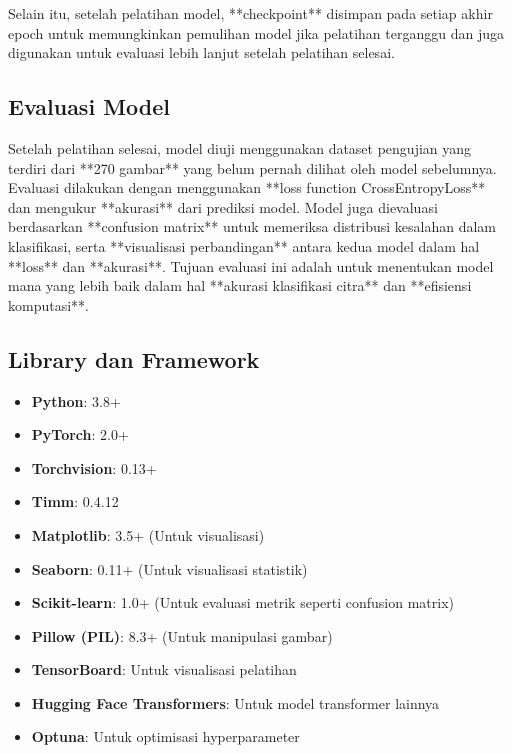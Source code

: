 \documentclass[11pt,a4paper]{article}
\begin{document}
Selain itu, setelah pelatihan model, **checkpoint** disimpan pada setiap akhir epoch untuk memungkinkan pemulihan model jika pelatihan terganggu dan juga digunakan untuk evaluasi lebih lanjut setelah pelatihan selesai.

\subsection{Evaluasi Model}
Setelah pelatihan selesai, model diuji menggunakan dataset pengujian yang terdiri dari **270 gambar** yang belum pernah dilihat oleh model sebelumnya. Evaluasi dilakukan dengan menggunakan **loss function CrossEntropyLoss** dan mengukur **akurasi** dari prediksi model. Model juga dievaluasi berdasarkan **confusion matrix** untuk memeriksa distribusi kesalahan dalam klasifikasi, serta **visualisasi perbandingan** antara kedua model dalam hal **loss** dan **akurasi**. Tujuan evaluasi ini adalah untuk menentukan model mana yang lebih baik dalam hal **akurasi klasifikasi citra** dan **efisiensi komputasi**.

\subsection{Library dan Framework}
\begin{itemize}
    \item \textbf{Python}: 3.8+
    \item \textbf{PyTorch}: 2.0+ 
    \item \textbf{Torchvision}: 0.13+
    \item \textbf{Timm}: 0.4.12
    \item \textbf{Matplotlib}: 3.5+ (Untuk visualisasi)
    \item \textbf{Seaborn}: 0.11+ (Untuk visualisasi statistik)
    \item \textbf{Scikit-learn}: 1.0+ (Untuk evaluasi metrik seperti confusion matrix)
    \item \textbf{Pillow (PIL)}: 8.3+ (Untuk manipulasi gambar)
    \item \textbf{TensorBoard}: Untuk visualisasi pelatihan
    \item \textbf{Hugging Face Transformers}: Untuk model transformer lainnya
    \item \textbf{Optuna}: Untuk optimisasi hyperparameter
\end{itemize}
\end{document}
